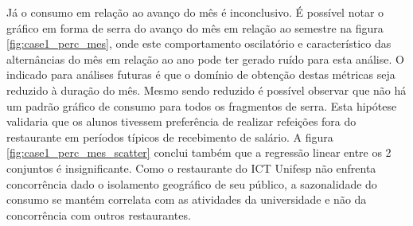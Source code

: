 \documentclass[	12pt, Times, openright, twoside, a4paper, english, brazil]{abntex2}
\begin{document}
{\begin{center}
                    \begin{minipage}[c]{0.5\textwidth}
                    \begin{figure}[H]
                    \end{figure}
                    \end{minipage}
                \end{center}
                }
                Já o consumo em relação ao avanço do mês é inconclusivo. É possível notar o gráfico em forma de serra do avanço do mês em relação ao semestre na figura \ref{fig:case1_perc_mes}, onde este comportamento oscilatório e característico das alternâncias do mês em relação ao ano pode ter gerado ruído para esta análise. O indicado para análises futuras é que o domínio de obtenção destas métricas seja reduzido à duração do mês. Mesmo sendo reduzido é possível observar que não há um padrão gráfico de consumo para todos os fragmentos de serra. Esta hipótese validaria que os alunos tivessem preferência de realizar refeições fora do restaurante em períodos típicos de recebimento de salário. A figura \ref{fig:case1_perc_mes_scatter} conclui também que a regressão linear entre os 2 conjuntos é insignificante. Como o restaurante do ICT Unifesp não enfrenta concorrência dado o isolamento geográfico de seu público, a sazonalidade do consumo se mantém correlata com as atividades da universidade e não da concorrência com outros restaurantes.
                
\end{document}

